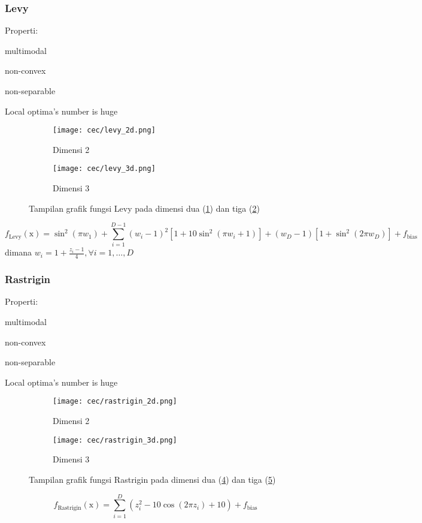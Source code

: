 \subsubsection{Levy}
\noindent Properti:
\begin{packed_item}
  \item multimodal
  \item non-convex
  \item non-separable
  \item Local optima's number is huge
\end{packed_item}
\begin{figure}[H]
	\centering
	\begin{subfigure}[b]{0.4\textwidth}
		\centering
		\texttt{[image: cec/levy\_2d.png]}
		\caption{Dimensi 2}
		\label{fig:levy-2d}
	\end{subfigure}
	\hfill
	\begin{subfigure}[b]{0.4\textwidth}
		\centering
		\texttt{[image: cec/levy\_3d.png]}
		\caption{Dimensi 3}
		\label{fig:levy-3d}
	\end{subfigure}
	\caption{Tampilan grafik fungsi Levy pada dimensi dua (\cref{fig:levy-2d}) dan tiga (\cref{fig:levy-3d})}
	\label{fig:levy}
\end{figure}
\begin{equation}
  f_{\text{Levy}}(\mathrm{x})=\sin^2\left(\pi w_1 \right)+\sum_{i=1}^{D-1}\left(w_i-1 \right)^2\left[1+10\sin^2\left( \pi w_i+1\right)\right]+\left(w_D-1 \right)\left[1+\sin^2\left( 2\pi w_D\right)  \right]+f_{\text{bias}}
\end{equation}
dimana $w_i=1+\frac{z_i-1}{4},\forall i=1,\ldots,D$

\subsubsection{Rastrigin}
\noindent Properti:
\begin{packed_item}
  \item multimodal
  \item non-convex
  \item non-separable
  \item Local optima's number is huge
\end{packed_item}
\begin{figure}[H]
	\centering
	\begin{subfigure}[b]{0.4\textwidth}
		\centering
		\texttt{[image: cec/rastrigin\_2d.png]}
		\caption{Dimensi 2}
		\label{fig:rastrigin-2d}
	\end{subfigure}
	\hfill
	\begin{subfigure}[b]{0.4\textwidth}
		\centering
		\texttt{[image: cec/rastrigin\_3d.png]}
		\caption{Dimensi 3}
		\label{fig:rastrigin-3d}
	\end{subfigure}
	\caption{Tampilan grafik fungsi Rastrigin pada dimensi dua (\cref{fig:rastrigin-2d}) dan tiga (\cref{fig:rastrigin-3d})}
	\label{fig:rastrigin}
\end{figure}
\begin{equation}
  f_{\text{Rastrigin}}(\mathrm{x})=\sum_{i=1}^{D}\left(z_i^2-10\cos\left(2\pi z_i \right)+10\right) +f_{\text{bias}}
\end{equation}

